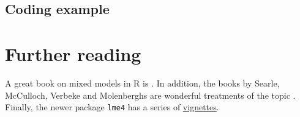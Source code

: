 \subsection{Coding example}



\section{Further reading}
A great book on mixed models in R is \cite{pinheiro2006mixed}. 
In addition, the books by Searle, McCulloch,
Verbeke and Molenberghs are  wonderful treatments of the topic
\citep{mcculloch2001linear,verbeke2009linear}. Finally, the
newer package \texttt{lme4} has a series of 
\href{https://cran.r-project.org/web/packages/lme4/index.html}{vignettes}.

